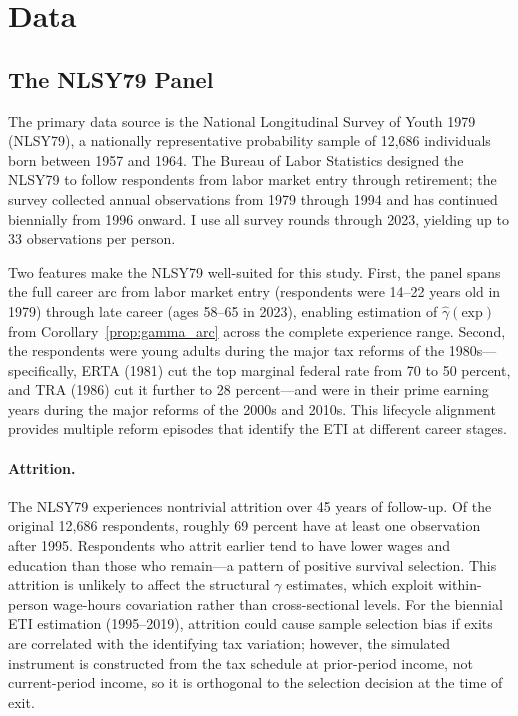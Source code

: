 \documentclass[12pt]{article}
\theoremstyle{definition}
\theoremstyle{remark}
\begin{document}
\section{Data}
\label{sec:data}

\subsection{The NLSY79 Panel}

The primary data source is the National Longitudinal Survey of Youth 1979 (NLSY79), a
nationally representative probability sample of 12,686 individuals born between 1957 and 1964.
The Bureau of Labor Statistics designed the NLSY79 to follow respondents from labor market
entry through retirement; the survey collected annual observations from 1979 through 1994
and has continued biennially from 1996 onward. I use all survey rounds through 2023, yielding
up to 33 observations per person.

Two features make the NLSY79 well-suited for this study. First, the panel spans the full
career arc from labor market entry (respondents were 14--22 years old in 1979) through late
career (ages 58--65 in 2023), enabling estimation of $\hat{\gamma}(\text{exp})$ from
Corollary~\ref{prop:gamma_arc} across the complete experience range. Second, the respondents
were young adults during the major tax reforms of the 1980s---specifically, ERTA (1981)
cut the top marginal federal rate from 70 to 50 percent, and TRA (1986) cut it further to
28 percent---and were in their prime earning years during the major reforms of the 2000s
and 2010s. This lifecycle alignment provides multiple reform episodes that identify the ETI
at different career stages.

\paragraph{Attrition.} The NLSY79 experiences nontrivial attrition over 45 years of
follow-up. Of the original 12,686 respondents, roughly 69 percent have at least one
observation after 1995. Respondents who attrit earlier tend to have lower wages and education
than those who remain---a pattern of positive survival selection. This attrition is unlikely
to affect the structural $\gamma$ estimates, which exploit within-person wage-hours covariation
rather than cross-sectional levels. For the biennial ETI estimation (1995--2019), attrition
could cause sample selection bias if exits are correlated with the identifying tax variation;
however, the simulated instrument is constructed from the tax schedule at prior-period income,
not current-period income, so it is orthogonal to the selection decision at the time of exit.
\end{document}
